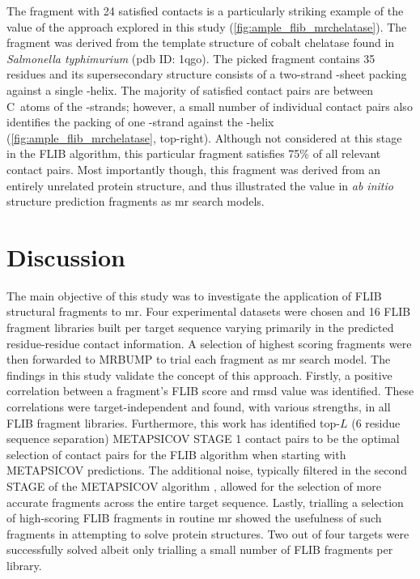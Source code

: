 The fragment with 24 satisfied contacts is a particularly striking example of the value of the approach explored in this study (\cref{fig:ample_flib_mrchelatase}). The fragment was derived from the template structure of cobalt chelatase found in \textit{Salmonella typhimurium} (\gls{pdb} ID: 1qgo). The picked fragment contains 35 residues and its supersecondary structure consists of a two-strand \textbeta-sheet packing against a single \textalpha-helix. The majority of satisfied contact pairs are between C\textbeta\ atoms of the \textbeta-strands; however, a small number of individual contact pairs also identifies the packing of one \textbeta-strand against the \textalpha-helix (\cref{fig:ample_flib_mrchelatase}, top-right). Although not considered at this stage in the FLIB algorithm, this particular fragment satisfies 75\% of all relevant contact pairs. Most importantly though, this fragment was derived from an entirely unrelated protein structure, and thus illustrated the value in \textit{ab initio} structure prediction fragments as \gls{mr} search models.

\section{Discussion}
The main objective of this study was to investigate the application of FLIB structural fragments to \gls{mr}. Four experimental datasets were chosen and 16 FLIB fragment libraries built per target sequence varying primarily in the predicted residue-residue contact information. A selection of highest scoring fragments were then forwarded to MRBUMP to trial each fragment as \gls{mr} search model. The findings in this study validate the concept of this approach. Firstly, a positive correlation between a fragment's FLIB score and \gls{rmsd} value was identified. These correlations were target-independent and found, with various strengths, in all FLIB fragment libraries. Furthermore, this work has identified top-$L$ (6 residue sequence separation) METAPSICOV STAGE 1 contact pairs to be the optimal selection of contact pairs for the FLIB algorithm when starting with METAPSICOV predictions. The additional noise, typically filtered in the second STAGE of the METAPSICOV algorithm \cite{Jones2015-wp}, allowed for the selection of more accurate fragments across the entire target sequence. Lastly, trialling a selection of high-scoring FLIB fragments in routine \gls{mr} showed the usefulness of such fragments in attempting to solve protein structures. Two out of four targets were successfully solved albeit only trialling a small number of FLIB fragments per library.

